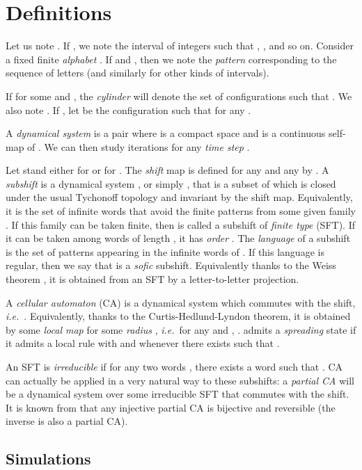 \documentclass{jac}
\let\dfn\emph
\newcommand{\ie}{\textit{i.e.}\ }
\theoremstyle{definition}
\begin{document}
\section{Definitions}

Let us note . If , we note  the interval of integers  such that , ,  and so on.
Consider a fixed finite \dfn{alphabet} .
If  and , then we note  the \dfn{pattern} corresponding to the sequence of letters  (and similarly for other kinds of intervals).

If  for some  and , the \dfn{cylinder}  will denote the set of configurations  such that . We also note .
If , let  be the configuration  such that  for any .

A \dfn{dynamical system} is a pair  where  is a compact space and  is a continuous self-map of . We can then study iterations  for any \dfn{time step} .

Let  stand either for  or for . The \dfn{shift} map  is defined for any  and any  by .
A \dfn{subshift} is a dynamical system , or simply , that is a subset of  which is closed under the usual Tychonoff topology and invariant by the shift map.
Equivalently, it is the set  of infinite words that avoid the finite patterns from some given family .
If this family can be taken finite, then  is called a subshift of \dfn{finite type} (SFT). If it can be taken among words of length , it has \dfn{order} .
The \dfn{language}  of a subshift  is the set  of patterns appearing in the infinite words of .
If this language is regular, then we say that  is a \dfn{sofic} subshift. Equivalently thanks to the Weiss theorem \cite{weiss}, it is obtained from an SFT by a letter-to-letter projection.

A \dfn{cellular automaton} (CA) is a dynamical system  which commutes with the shift, \ie .
Equivalently, thanks to the Curtis-Hedlund-Lyndon theorem, it is obtained by some \dfn{local map}  for some \dfn{radius} , \ie for any  and , .
 admits a \dfn{spreading} state  if it admits a local rule  with  and  whenever there exists  such that .

An SFT  is \dfn{irreducible} if for any two words , there exists a word  such that .
CA can actually be applied in a very natural way to these subshifts: a \dfn{partial CA} will be a dynamical system over some irreducible SFT that commutes with the shift. It is known from \cite{edensof} that any injective partial CA is bijective and reversible (the inverse is also a partial CA).



\subsection{Simulations}
\end{document}
